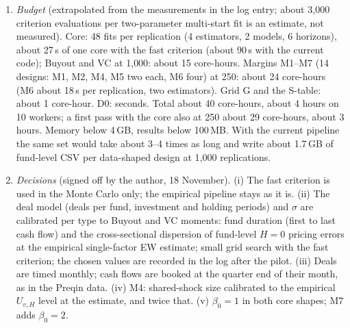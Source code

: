 \documentclass[11pt]{article}
\begin{document}
\begin{enumerate}
 M1~Fund counts scaled by $\{0.25, 4\}$ (thin vintages, the G2 stress case; and P2's $n_v$ margin). M2~Calendar: early and late half of the actual calendar (P2's sub-periods). M3~$\sigma$ at the other level. M4~Shared vintage shocks, two sizes (calibrated to the empirical $U_{v,H}$ level, and twice that): target shift away from $\theta_0$ at long horizons. M5~Lifetimes 2/2 and 3/10 years (P4). M6~Second factor, $\beta_{2nd}=0.5$ for each of ME, IA, ROE, EG (P3), L2 on vintage portfolios and $U_{v,H}$ with $q_v=1$ only; includes how often MKT$+$EG sits on a bound. M7~$\beta_0=2$ (VC-like). All margins Buyout-shaped, 250 replications.
 G~DLP12 grid: stylized consecutive vintages, $H=0$, $(\alpha,\beta)$, L2 on vintage portfolios, $\sigma=30\%$, $n_v\in\{5,20,50,200\}\times V\in\{20,40,80\}$, 500 replications per cell, plus horizon 15 years for the P2 comparison; the S1--S10 rows of the Appendix~D table are regenerated with the same driver under the r5 domain (S2 and S3 are cells of the grid). Separates the noise tilt ($n_v$) from finite-$V$ effects.
\item \emph{Budget} (extrapolated from the measurements in the log entry; about 3{,}000 criterion evaluations per two-parameter multi-start fit is an estimate, not measured). Core: 48 fits per replication (4 estimators, 2 models, 6 horizons), about 27\,s of one core with the fast criterion (about 90\,s with the current code); Buyout and VC at 1{,}000: about 15 core-hours. Margins M1--M7 (14 designs: M1, M2, M4, M5 two each, M6 four) at 250: about 24 core-hours (M6 about 18\,s per replication, two estimators). Grid G and the S-table: about 1 core-hour. D0: seconds. Total about 40 core-hours, about 4 hours on 10 workers; a first pass with the core also at 250 about 29 core-hours, about 3 hours. Memory below 4\,GB, results below 100\,MB. With the current pipeline the same set would take about 3--4 times as long and write about 1.7\,GB of fund-level CSV per data-shaped design at 1{,}000 replications.
\item \emph{Decisions} (signed off by the author, 18 November). (i) The fast criterion is used in the Monte Carlo only; the empirical pipeline stays as it is. (ii) The deal model (deals per fund, investment and holding periods) and $\sigma$ are calibrated per type to Buyout and VC moments: fund duration (first to last cash flow) and the cross-sectional dispersion of fund-level $H=0$ pricing errors at the empirical single-factor EW estimate; small grid search with the fast criterion; the chosen values are recorded in the log after the pilot. (iii) Deals are timed monthly; cash flows are booked at the quarter end of their month, as in the Preqin data. (iv) M4: shared-shock size calibrated to the empirical $U_{v,H}$ level at the estimate, and twice that. (v) $\beta_0=1$ in both core shapes; M7 adds $\beta_0=2$.

\end{enumerate}
\end{document}

